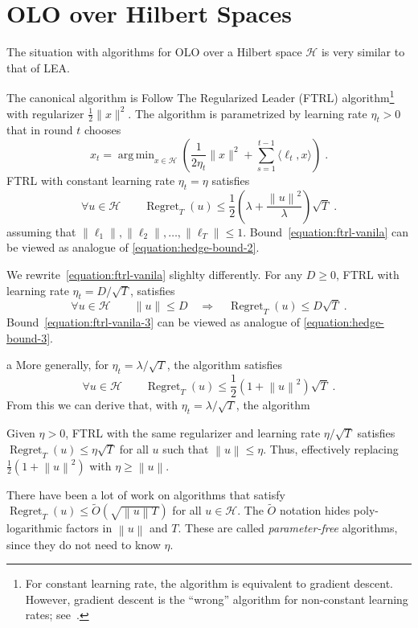 \documentclass{colt2016} %
\DeclareMathOperator{\Regret}{Regret}
\renewcommand{\H}{\mathcal{H}}  %
\newcommand{\norm}[1]{\left\|{#1}\right\|}
\DeclareMathOperator*{\argmin}{arg\,min}
\begin{document}
\section{OLO over Hilbert Spaces}

The situation with algorithms for OLO over a Hilbert space $\H$ is very similar
to that of LEA.

The canonical algorithm is Follow The Regularized Leader (FTRL) algorithm\footnote{For constant learning rate, the algorithm is
equivalent to gradient descent. However, gradient descent is the ``wrong'' algorithm
for non-constant learning rates; see~\cite{Orabona-Pal-2016-scale-free}.}
with regularizer $\frac{1}{2}\|x\|^2$. The algorithm is parametrized by learning rate $\eta_t > 0$
that in round $t$ chooses
$$
x_t = \argmin_{x \in \H} \left( \frac{1}{2\eta_t}\|x\|^2 + \sum_{s=1}^{t-1} \langle \ell_t, x \rangle \right) \; .
$$
FTRL with constant learning rate $\eta_t = \eta$ satisfies
\begin{equation}
\label{equation:ftrl-vanila}
\forall u \in \H \qquad \Regret_T(u) \le \frac{1}{2} \left( \lambda + \frac{\norm{u}^2}{\lambda} \right) \sqrt{T} \; .
\end{equation}
assuming that $\norm{\ell_1}, \norm{\ell_2}, \dots, \norm{\ell_T} \le 1$.
Bound~\eqref{equation:ftrl-vanila} can be viewed as analogue of \eqref{equation:hedge-bound-2}.

We rewrite~\eqref{equation:ftrl-vanila} slighlty differently. For any $D \ge
0$, FTRL with learning rate $\eta_t = D/\sqrt{T}$, satisfies
\begin{equation}
\label{equation:ftrl-vanila-3}
\forall u \in \H \qquad \|u\| \le D \quad  \Longrightarrow \quad \Regret_T(u) \le D \sqrt{T} \; .
\end{equation}
Bound~\eqref{equation:ftrl-vanila-3} can be viewed as analogue of \eqref{equation:hedge-bound-3}.

a
More generally, for $\eta_t = \lambda/\sqrt{T}$, the algorithm satisfies
$$
\forall u \in \H \qquad \Regret_T(u) \le \frac{1}{2}(1 + \norm{u}^2) \sqrt{T} \; .
$$
From this we can derive that,  with $\eta_t = \lambda/\sqrt{T}$,
 the algorithm

Given $\eta > 0$, FTRL with the same regularizer and
learning rate $\eta/\sqrt{T}$ satisfies $\Regret_T(u) \le \eta \sqrt{T}$
for all $u$ such that $\norm{u} \le \eta$. Thus, effectively replacing
$\frac{1}{2}(1 + \norm{u}^2)$ with $\eta \ge \norm{u}$.

There have been a lot of work \citep{Streeter-McMahan-2012, Orabona-2013,
McMahan-Abernethy-2013, McMahan-Orabona-2014} on algorithms that satisfy
$\Regret_T(u) \le \widetilde O(\sqrt{\norm{u} T})$ for all $u \in \H$.
The $\widetilde O$ notation hides poly-logarithmic factors in $\norm{u}$ and
$T$. These are called \emph{parameter-free} algorithms, since they do not need to
know $\eta$.
\end{document}
